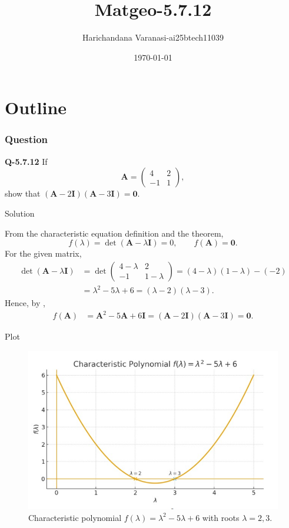\documentclass{beamer}
\title{Matgeo-5.7.12}
\author{Harichandana Varanasi-ai25btech11039}
\date{\today}
\theoremstyle{remark}
\newcommand{\myvec}[1]{\ensuremath{\begin{pmatrix}#1\end{pmatrix}}}
\let\vec\mathbf
\begin{document}
\begin{frame}
\titlepage
\end{frame}

\section*{Outline}

\begin{frame}
\frametitle{Question}

\textbf{Q-5.7.12}
If 
\[
\vec{A}=\myvec{4 & 2\\ -1 & 1},
\]
show that $(\vec{A}-2\vec{I})(\vec{A}-3\vec{I})=\vec{0}$.



\end{frame}
%
\begin{frame}{Solution}



\renewcommand\theequation{\arabic{equation}}
\setcounter{equation}{0}

From the characteristic equation definition and the  theorem,
\[
f(\lambda)=\det(\vec{A}-\lambda\vec{I})=0,\qquad f(\vec{A})=\vec{0}.
\]
For the given matrix,
\begin{align}
\det(\vec{A}-\lambda\vec{I})
&=\det\myvec{4-\lambda & 2\\ -1 & 1-\lambda}
=(4-\lambda)(1-\lambda)-(-2) \nonumber\\
&=\lambda^2-5\lambda+6
=(\lambda-2)(\lambda-3).
\label{eq:char}
\end{align}
Hence, by  ,
\begin{align}
f(\vec{A})
&=\vec{A}^2-5\vec{A}+6\vec{I}
=(\vec{A}-2\vec{I})(\vec{A}-3\vec{I})
=\vec{0}.
\label{eq:CH}
\end{align}


\end{frame}
\begin{frame}{Plot}
    \begin{figure}[H]
    \centering
    \includegraphics[width=0.75\linewidth]{figs/matgeo-5.7.12.jpeg}
    \caption{Characteristic polynomial $f(\lambda)=\lambda^2-5\lambda+6$ with roots $\lambda=2,3$.}

    \label{fig:4.8.35-3d}
\end{figure}
\end{frame}
\end{document}
